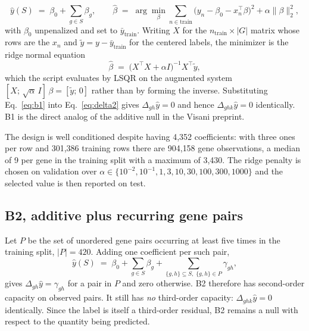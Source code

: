 %
\begin{equation}
  \hat{y}(S) \;=\; \beta_0 + \sum_{g \in S} \beta_g ,
  \qquad
  \hat{\beta} \;=\; \arg\min_{\beta} \sum_{n \in \mathrm{train}}
  \bigl(y_n - \beta_0 - x_n^{\top}\beta\bigr)^2 + \alpha \lVert \beta \rVert_2^2 ,
  \label{eq:b1}
\end{equation}
%
with $\beta_0$ unpenalized and set to $\bar{y}_{\mathrm{train}}$. Writing $X$
for the $n_{\mathrm{train}} \times |G|$ matrix whose rows are the $x_n$ and
$\tilde{y} = y - \bar{y}_{\mathrm{train}}$ for the centered labels, the
minimizer is the ridge normal equation
%
\begin{equation}
  \hat{\beta} \;=\; \bigl(X^{\top} X + \alpha I\bigr)^{-1} X^{\top} \tilde{y} ,
  \label{eq:b1closed}
\end{equation}
%
which the script evaluates by LSQR on the augmented system
$[X;\, \sqrt{\alpha}\, I]\,\beta = [\tilde{y};\, 0]$ rather than by forming the
inverse. Substituting Eq.~\ref{eq:b1} into Eq.~\ref{eq:delta2} gives
$\Delta_{gh}\hat{y} = 0$ and hence $\Delta_{ghk}\hat{y} = 0$ identically. B1 is
the direct analog of the additive null in the Visani preprint.

The design is well conditioned despite having 4{,}352 coefficients: with three
ones per row and 301{,}386 training rows there are 904{,}158 gene observations,
a median of 9 per gene in the training split with a maximum of 3{,}430. The
ridge penalty is chosen on validation over
$\alpha \in \{10^{-2}, 10^{-1}, 1, 3, 10, 30, 100, 300, 1000\}$ and the selected
value is then reported on test.

\subsection{B2, additive plus recurring gene pairs}

Let $P$ be the set of unordered gene pairs occurring at least five times in the
training split, $|P| = 420$. Adding one coefficient per such pair,
%
\begin{equation}
  \hat{y}(S) \;=\; \beta_0 + \sum_{g \in S} \beta_g
  + \sum_{\{g,h\} \subseteq S,\; \{g,h\} \in P} \gamma_{gh} ,
  \label{eq:b2}
\end{equation}
%
gives $\Delta_{gh}\hat{y} = \gamma_{gh}$ for a pair in $P$ and zero otherwise.
B2 therefore has second-order capacity on observed pairs. It still has
\emph{no} third-order capacity: $\Delta_{ghk}\hat{y} = 0$ identically. Since the
label is itself a third-order residual, B2 remains a null with respect to the
quantity being predicted.

